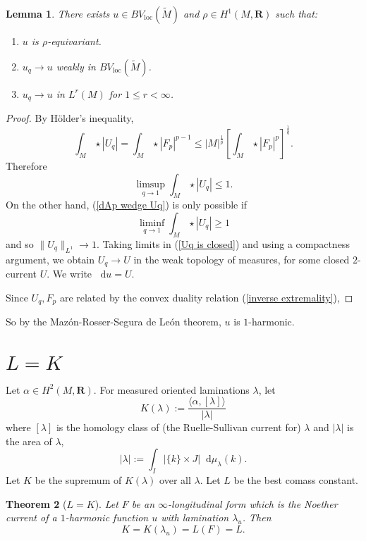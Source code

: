 \documentclass[reqno,11pt]{amsart}
\newcommand{\RR}{\mathbf{R}}
\newcommand*\dif{\mathop{}\!\mathrm{d}}
\newcommand{\loc}{\mathrm{loc}}
\newtheorem{theorem}{Theorem}[section]
\newtheorem{lemma}[theorem]{Lemma}
\theoremstyle{definition}
\numberwithin{equation}{section}
\begin{document}
\begin{lemma}
There exists $u \in BV_\loc(\tilde M)$ and $\rho \in H^1(M, \RR)$ such that:
\begin{enumerate}
\item $u$ is $\rho$-equivariant.
\item $u_q \to u$ weakly in $BV_\loc(\tilde M)$.
\item $u_q \to u$ in $L^r(M)$ for $1 \leq r < \infty$.
\end{enumerate}
\end{lemma}
\begin{proof}
By H\"older's inequality,
$$\int_M \star |U_q| = \int_M \star |F_p|^{p - 1} \leq |M|^{\frac{1}{p}} \left[\int_M \star |F_p|^p\right]^{\frac{1}{q}}.$$
Therefore 
$$\limsup_{q \to 1} \int_M \star |U_q| \leq 1.$$
On the other hand, (\ref{dAp wedge Uq}) is only possible if
$$\liminf_{q \to 1} \int_M \star |U_q| \geq 1$$
and so $\|U_q\|_{L^1} \to 1$.
Taking limits in (\ref{Uq is closed}) and using a compactness argument, we obtain $U_q \to U$ in the weak topology of measures, for some closed $2$-current $U$.
We write $\dif u = U$.

Since $U_q, F_p$ are related by the convex duality relation (\ref{inverse extremality}),
\end{proof}



So by the Maz\'on-Rosser-Segura de Le\'on theorem, $u$ is $1$-harmonic.

\section{\texorpdfstring{$L = K$}{L equals K}}
Let $\alpha \in H^2(M, \RR)$.
For measured oriented laminations $\lambda$, let 
$$K(\lambda) := \frac{\langle \alpha, [\lambda]\rangle}{|\lambda|}$$
where $[\lambda]$ is the homology class of (the Ruelle-Sullivan current for) $\lambda$ and $|\lambda|$ is the area of $\lambda$,
$$|\lambda| := \int_I |\{k\} \times J| \dif \mu_\lambda(k).$$
Let $K$ be the supremum of $K(\lambda)$ over all $\lambda$.
Let $L$ be the best comass constant.

\begin{theorem}[$L = K$]
Let $F$ be an $\infty$-longitudinal form which is the Noether current of a $1$-harmonic function $u$ with lamination $\lambda_u$.
Then
$$K = K(\lambda_u) = L(F) = L.$$
\end{theorem}

\appendix 
\end{document}
